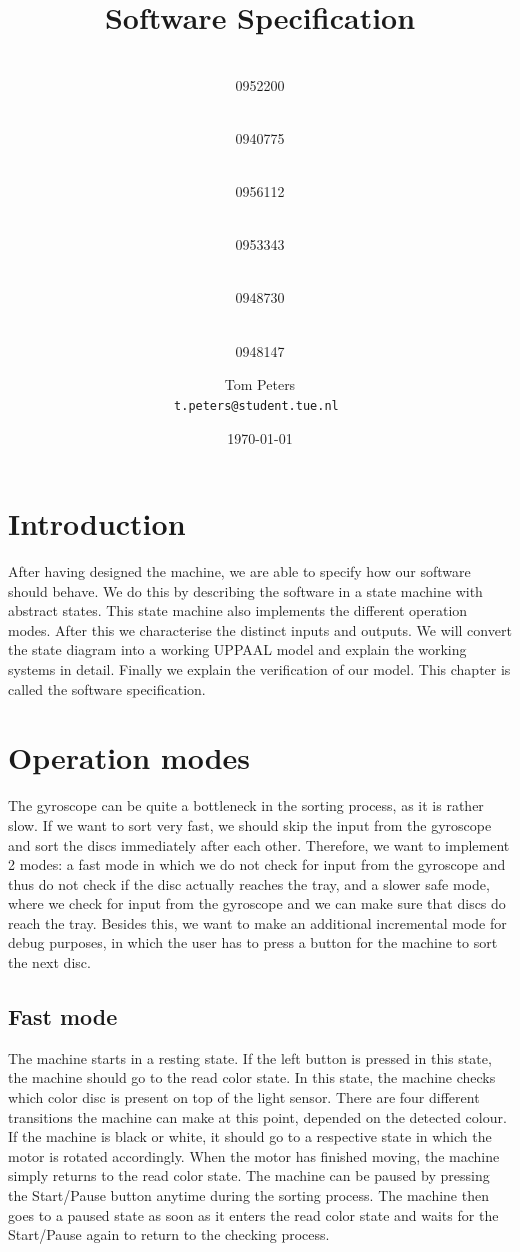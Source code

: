 \documentclass[a4paper,oneside,11pt]{article}
\title{\vspace{-\baselineskip}\sffamily\bfseries Software Specification}
\author{
	\makebox[.25\linewidth]{Sergio van Amerongen}\\0952200 \and
	\makebox[.25\linewidth]{Stefan Cloudt}\\0940775 \and
	\makebox[.25\linewidth]{Daan de Graaf}\\0956112 \and
	\makebox[.25\linewidth]{Robert van Lente}\\0953343 \and
	\makebox[.25\linewidth]{Tom Peters}\\0948730 \and
	\makebox[.25\linewidth]{Berrie Trippe}\\0948147 
	\and \makebox[.75\linewidth]{\textbf{Responsible:}} \and
	Tom Peters\\ \tt{t.peters@student.tue.nl}
}
\date{\today}
\begin{document}
\maketitle

\section{Introduction}
After having designed the machine, we are able to specify how our software should behave. We do this by describing the software in a state machine with abstract states. This state machine also implements the different operation modes. After this we characterise the distinct inputs and outputs. We will convert the state diagram into a working UPPAAL model and explain the working systems in detail. Finally we explain the verification of our model. This chapter is called the software specification.

\section{Operation modes}
The gyroscope can be quite a bottleneck in the sorting process, as it is rather slow. If we want to sort very fast, we should skip the input from the gyroscope and sort the discs immediately after each other. Therefore, we want to implement 2 modes: a fast mode in which we do not check for input from the gyroscope and thus do not check if the disc actually reaches the tray, and a slower safe mode, where we check for input from the gyroscope and we can make sure that discs do reach the tray. Besides this, we want to make an additional incremental mode for debug purposes, in which the user has to press a button for the machine to sort the next disc.

\subsection{Fast mode}
The machine starts in a resting state. If the left button is pressed in this state, the machine should go to the read color state. In this state, the machine checks which color disc is present on top of the light sensor. There are four different transitions the machine can make at this point, depended on the detected colour. If the machine is black or white, it should go to a respective state in which the motor is rotated accordingly. When the motor has finished moving, the machine simply returns to the read color state. The machine can be paused by pressing the Start/Pause button anytime during the sorting process. The machine then goes to a paused state as soon as it enters the read color state and waits for the Start/Pause again to return to the checking process.
\end{document}
